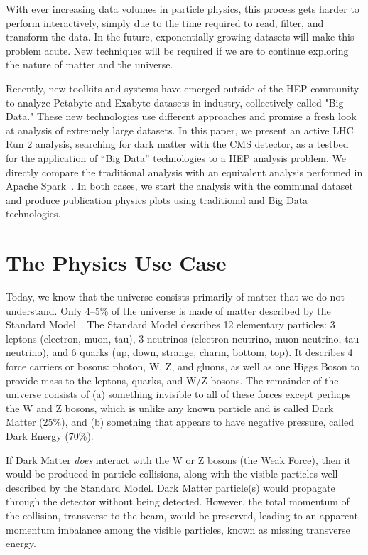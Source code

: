 \documentclass[a4paper]{jpconf}
\begin{document}
With ever increasing data volumes in particle physics, this process gets harder to perform interactively, simply due to the time required to read, filter, and transform the data. In the future, exponentially growing datasets will make this problem acute. New techniques will be required if we are to continue exploring the nature of matter and the universe.

Recently, new toolkits and systems have emerged outside of the HEP community to analyze Petabyte and Exabyte datasets in industry, collectively called "Big Data." These new technologies use different approaches and promise a fresh look at analysis of extremely large datasets. In this paper, we present an active LHC Run 2 analysis, searching for dark matter with the CMS detector, as a testbed for the application of “Big Data” technologies to a HEP analysis problem. We directly compare the traditional analysis with an equivalent analysis performed in Apache Spark~\cite{Zaharia:2010:SCC:1863103.1863113}. In both cases, we start the analysis with the communal dataset and produce publication physics plots using traditional and Big Data technologies. 

\section{The Physics Use Case}

Today, we know that the universe consists primarily of matter that we do not understand. Only 4--5\% of the universe is made of matter described by the Standard Model~\cite{cosmology}. The Standard Model describes 12 elementary particles: 3 leptons (electron, muon, tau), 3 neutrinos (electron-neutrino, muon-neutrino, tau-neutrino), and 6 quarks (up, down, strange, charm, bottom, top). It describes 4 force carriers or bosons: photon, W, Z, and gluons, as well as one Higgs Boson to provide mass to the leptons, quarks, and W/Z bosons. The remainder of the universe consists of (a) something invisible to all of these forces except perhaps the W and Z bosons, which is unlike any known particle and is called Dark Matter (25\%), and (b) something that appears to have negative pressure, called Dark Energy (70\%).

If Dark Matter {\it does} interact with the W or Z bosons (the Weak Force), then it would be produced in particle collisions, along with the visible particles well described by the Standard Model. Dark Matter particle(s) would propagate through the detector without being detected. However, the total momentum of the collision, transverse to the beam, would be preserved, leading to an apparent momentum imbalance among the visible particles, known as missing transverse energy.
\end{document}
